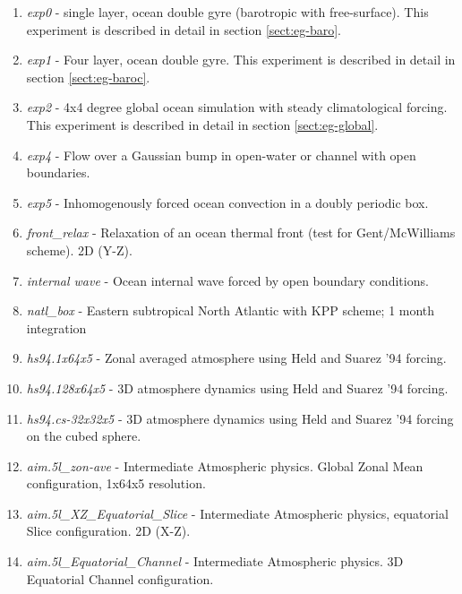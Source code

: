 \begin{enumerate}
\item \textit{exp0} - single layer, ocean double gyre (barotropic with
free-surface). This experiment is described in detail in section
\ref{sect:eg-baro}.

\item \textit{exp1} - Four layer, ocean double gyre. This experiment is described in detail in section
\ref{sect:eg-baroc}.

\item \textit{exp2} - 4x4 degree global ocean simulation with steady
climatological forcing. This experiment is described in detail in section
\ref{sect:eg-global}.

\item \textit{exp4} - Flow over a Gaussian bump in open-water or channel
with open boundaries.

\item \textit{exp5} - Inhomogenously forced ocean convection in a doubly
periodic box.

\item \textit{front\_relax} - Relaxation of an ocean thermal front (test for
Gent/McWilliams scheme). 2D (Y-Z).

\item \textit{internal wave} - Ocean internal wave forced by open boundary
conditions.

\item \textit{natl\_box} - Eastern subtropical North Atlantic with KPP
scheme; 1 month integration

\item \textit{hs94.1x64x5} - Zonal averaged atmosphere using Held and Suarez
'94 forcing.

\item \textit{hs94.128x64x5} - 3D atmosphere dynamics using Held and Suarez
'94 forcing.

\item \textit{hs94.cs-32x32x5} - 3D atmosphere dynamics using Held and
Suarez '94 forcing on the cubed sphere.

\item \textit{aim.5l\_zon-ave} - Intermediate Atmospheric physics. Global 
Zonal Mean configuration, 1x64x5 resolution.

\item \textit{aim.5l\_XZ\_Equatorial\_Slice} - Intermediate Atmospheric
physics, equatorial Slice configuration.
2D (X-Z).

\item \textit{aim.5l\_Equatorial\_Channel} - Intermediate Atmospheric
physics. 3D Equatorial Channel configuration.


\end{enumerate}

